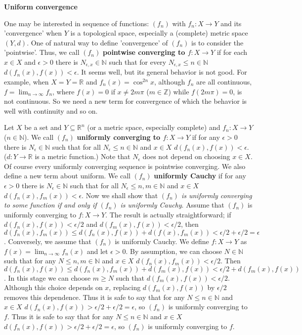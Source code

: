 \documentclass{article}
\newcommand{\NaN}{\mathbb{N}}
\newcommand{\InZ}{\mathbb{Z}}
\newcommand{\ReR}{\mathbb{R}}
\begin{document}
\textbf{Uniform convergence}

One may be interested in sequence of functions: $(f_n)$ with $f_n : X \to Y$ and its 'convergence' when $Y$ is a topological space, especially a (complete) metric space $(Y, d)$.
One of natural way to define 'convergence' of $(f_n)$ is to consider the 'pointwise'.
Thus, we call $(f_n)$ \textbf{pointwise converging to $f : X \to Y$} if for each $x \in X$ and $\epsilon > 0$ there is $N_{\epsilon, x} \in \NaN$ such that for every $N_{\epsilon, x} \le n \in \NaN$ $d(f_n(x), f(x)) < \epsilon$.
It seems well, but its general behavior is not good.
For example, when $X = Y = \ReR$ and $f_n(x) = \cos^{2n}{x}$, although $f_n$ are all continuous, $f = \lim_{n \to \infty} f_n$, where $f(x) = 0$ if $x \ne 2m\pi$ ($m \in \InZ$) while $f(2m\pi) = 0$, is not continuous.
So we need a new term for convergence of which the behavior is well with continuity and so on.

Let $X$ be a set and $Y \subseteq \ReR^n$ (or a metric space, especially complete) and $f_n : X \to Y$ ($n \in \NaN$).
We call $(f_n)$ \textbf{uniformly converging to $f : X \to Y$} if for any $\epsilon > 0$ there is $N_\epsilon \in \NaN$ such that for all $N_\epsilon \le n \in \NaN$ and $x \in X$ $d(f_n(x), f(x)) < \epsilon$.
($d : Y \to \ReR$ is a metric function.)
Note that $N_\epsilon$ does not depend on choosing $x \in X$.
Of course every uniformly converging sequence is pointwise converging.
We also define a new term about uniform.
We call $(f_n)$ \textbf{uniformly Cauchy} if for any $\epsilon > 0$ there is $N_\epsilon \in \NaN$ such that for all $N_\epsilon \le n, m \in \NaN$ and $x \in X$ $d(f_n(x), f_m(x)) < \epsilon$.
Now we shall show that \textit{$(f_n)$ is uniformly converging to some function if and only if $(f_n)$ is uniformly Cauchy}.
Assume that $(f_n)$ is uniformly converging to $f : X \to Y$.
The result is actually straightforward; if $d(f_n(x), f(x)) < \epsilon/2$ and $d(f_m(x), f(x)) < \epsilon/2$, then $d(f_n(x), f_m(x)) \le d(f_n(x), f(x)) + d(f(x), f_m(x)) < \epsilon/2 + \epsilon/2 = \epsilon$.
Conversely, we assume that $(f_n)$ is uniformly Cauchy.
We define $f : X \to Y$ as $f(x) = \lim_{n \to \infty} f_n(x)$ and let $\epsilon > 0$.
By assumption, we can choose $N \in \NaN$ such that for any $N \le n, m \in \NaN$ and $x \in X$ $d(f_n(x), f_m(x)) < \epsilon/2$.
Then $d(f_n(x), f(x)) \le d(f_n(x), f_m(x)) + d(f_m(x), f(x)) < \epsilon/2 + d(f_m(x), f(x))$.
In this stage we can choose $m \ge N$ such that $d(f_m(x), f(x)) < \epsilon/2$.
Although this choice depends on $x$, replacing $d(f_m(x), f(x))$ by $\epsilon/2$ removes this dependence.
Thus it is safe to say that for any $N \le n \in \NaN$ and $x \in X$ $d(f_n(x), f(x)) > \epsilon/2 + \epsilon/2 = \epsilon$, so $(f_n)$ is uniformly converging to $f$.
Thus it is safe to say that for any $N \le n \in \NaN$ and $x \in X$ $d(f_n(x), f(x)) > \epsilon/2 + \epsilon/2 = \epsilon$, so $(f_n)$ is uniformly converging to $f$.
\end{document}
